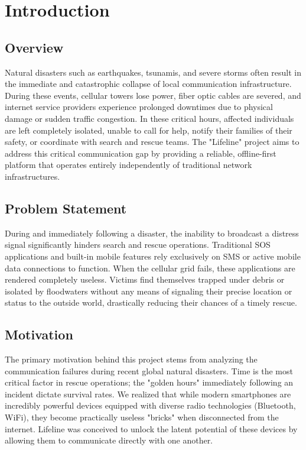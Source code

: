 
\chapter{Introduction} 

\label{Chapter1}

\section{Overview}
Natural disasters such as earthquakes, tsunamis, and severe storms often result in the immediate and catastrophic collapse of local communication infrastructure. During these events, cellular towers lose power, fiber optic cables are severed, and internet service providers experience prolonged downtimes due to physical damage or sudden traffic congestion. In these critical hours, affected individuals are left completely isolated, unable to call for help, notify their families of their safety, or coordinate with search and rescue teams. The "Lifeline" project aims to address this critical communication gap by providing a reliable, offline-first platform that operates entirely independently of traditional network infrastructures.

\section{Problem Statement}
During and immediately following a disaster, the inability to broadcast a distress signal significantly hinders search and rescue operations. Traditional SOS applications and built-in mobile features rely exclusively on SMS or active mobile data connections to function. When the cellular grid fails, these applications are rendered completely useless. Victims find themselves trapped under debris or isolated by floodwaters without any means of signaling their precise location or status to the outside world, drastically reducing their chances of a timely rescue.

\section{Motivation}
The primary motivation behind this project stems from analyzing the communication failures during recent global natural disasters. Time is the most critical factor in rescue operations; the "golden hours" immediately following an incident dictate survival rates. We realized that while modern smartphones are incredibly powerful devices equipped with diverse radio technologies (Bluetooth, WiFi), they become practically useless "bricks" when disconnected from the internet. Lifeline was conceived to unlock the latent potential of these devices by allowing them to communicate directly with one another.

